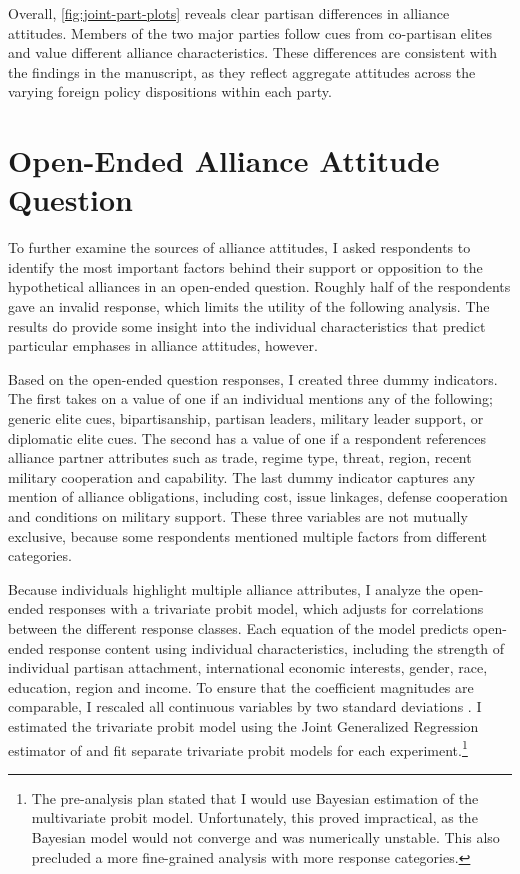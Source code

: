 \documentclass[12pt]{article}
\begin{document}
Overall, \autoref{fig:joint-part-plots} reveals clear partisan differences in alliance attitudes. 
Members of the two major parties follow cues from co-partisan elites and value different alliance characteristics. 
These differences are consistent with the findings in the manuscript, as they reflect aggregate attitudes across the varying foreign policy dispositions within each party. 



\section{Open-Ended Alliance Attitude Question} 


To further examine the sources of alliance attitudes, I asked respondents to identify the most important factors behind their support or opposition to the hypothetical alliances in an open-ended question. 
Roughly half of the respondents gave an invalid response, which limits the utility of the following analysis. 
The results do provide some insight into the individual characteristics that predict particular emphases in alliance attitudes, however. 


Based on the open-ended question responses, I created three dummy indicators. 
The first takes on a value of one if an individual mentions any of the following; generic elite cues, bipartisanship, partisan leaders, military leader support, or diplomatic elite cues. 
The second has a value of one if a respondent references alliance partner attributes such as trade, regime type, threat, region, recent military cooperation and capability. 
The last dummy indicator captures any mention of alliance obligations, including cost, issue linkages, defense cooperation and conditions on military support. 
These three variables are not mutually exclusive, because some respondents mentioned multiple factors from different categories. 


Because individuals highlight multiple alliance attributes, I analyze the open-ended responses with a trivariate probit model, which adjusts for correlations between the different response classes. 
Each equation of the model predicts open-ended response content using individual characteristics, including the strength of individual partisan attachment, international economic interests, gender, race, education, region and income. 
To ensure that the coefficient magnitudes are comparable, I rescaled all continuous variables by two standard deviations \citep{Gelman2008}. 
I estimated the trivariate probit model using the Joint Generalized Regression estimator of \citet{Braumoelleretal2018} and fit separate trivariate probit models for each experiment.\footnote{The pre-analysis plan stated that I would use Bayesian estimation of the multivariate probit model. Unfortunately, this proved impractical, as the Bayesian model would not converge and was numerically unstable. This also precluded a more fine-grained analysis with more response categories.} 
\end{document}
